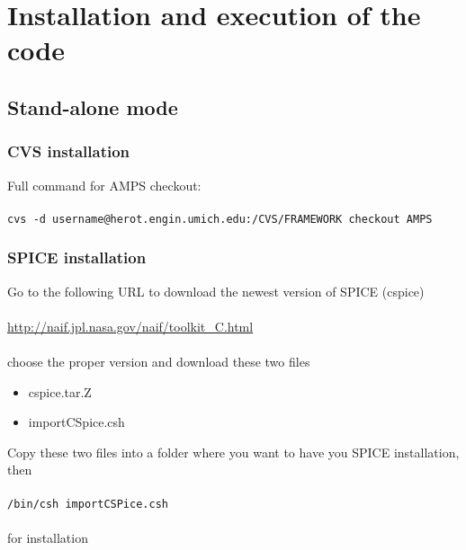\chapter{Installation and execution of the code}

\section{Stand-alone mode}

\subsection{CVS installation}
Full command for AMPS checkout:\\\\
{\tt cvs -d username@herot.engin.umich.edu:/CVS/FRAMEWORK checkout AMPS}
\subsection{SPICE installation}
Go to the following URL to download the newest version of SPICE (cspice)\\\\ \url{http://naif.jpl.nasa.gov/naif/toolkit_C.html}\\\\
choose the proper version and download these two files
\begin{itemize}
 \item cspice.tar.Z
 \item importCSpice.csh
\end{itemize}
Copy these two files into a folder where you want to have you SPICE installation, then\\\\
{\tt /bin/csh importCSPice.csh}\\\\
for installation



